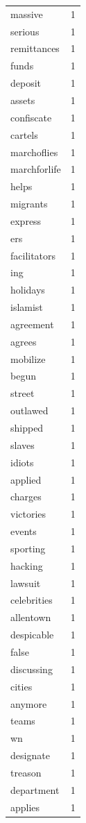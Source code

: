 \begin{tabular}{lr}
massive & 1 \\
serious & 1 \\
remittances & 1 \\
funds & 1 \\
deposit & 1 \\
assets & 1 \\
confiscate & 1 \\
cartels & 1 \\
marchoflies & 1 \\
marchforlife & 1 \\
helps & 1 \\
migrants & 1 \\
express & 1 \\
ers & 1 \\
facilitators & 1 \\
ing & 1 \\
holidays & 1 \\
islamist & 1 \\
agreement & 1 \\
agrees & 1 \\
mobilize & 1 \\
begun & 1 \\
street & 1 \\
outlawed & 1 \\
shipped & 1 \\
slaves & 1 \\
idiots & 1 \\
applied & 1 \\
charges & 1 \\
victories & 1 \\
events & 1 \\
sporting & 1 \\
hacking & 1 \\
lawsuit & 1 \\
celebrities & 1 \\
allentown & 1 \\
despicable & 1 \\
false & 1 \\
discussing & 1 \\
cities & 1 \\
anymore & 1 \\
teams & 1 \\
wn & 1 \\
designate & 1 \\
treason & 1 \\
department & 1 \\
applies & 1 \\

\end{tabular}
